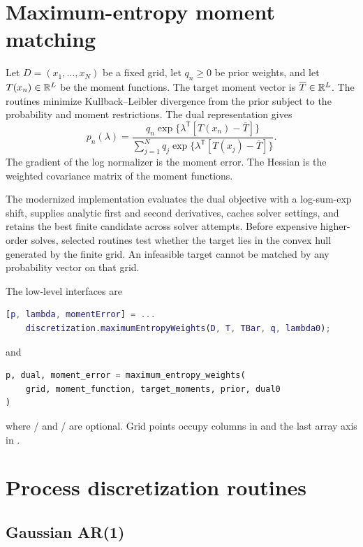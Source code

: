 \section{Maximum-entropy moment matching}
\label{sec:maxent}

Let $D=(x_1,\ldots,x_N)$ be a fixed grid, let $q_n\geq 0$ be prior weights,
and let $T(x_n)\in\mathbb{R}^L$ be the moment functions. The target moment vector is
$\overline T\in\mathbb{R}^L$. The routines minimize Kullback--Leibler divergence from
the prior subject to the probability and moment restrictions. The dual
representation gives
\begin{equation}
  p_n(\lambda)
  = \frac{q_n\exp\{\lambda^{\mathsf T}[T(x_n)-\overline T]\}}
  {\sum_{j=1}^N q_j
  \exp\{\lambda^{\mathsf T}[T(x_j)-\overline T]\}}.
  \label{eq:maxent-probability}
\end{equation}
The gradient of the log normalizer is the moment error. The Hessian is the
weighted covariance matrix of the moment functions.

The modernized implementation evaluates the dual objective with a log-sum-exp
shift, supplies analytic first and second derivatives, caches solver settings,
and retains the best finite candidate across solver attempts. Before expensive
higher-order solves, selected routines test whether the target lies in the
convex hull generated by the finite grid. An infeasible target cannot be
matched by any probability vector on that grid.

The low-level interfaces are
\begin{lstlisting}[language=Matlab]
[p, lambda, momentError] = ...
    discretization.maximumEntropyWeights(D, T, TBar, q, lambda0);
\end{lstlisting}
and
\begin{lstlisting}[language=Python]
p, dual, moment_error = maximum_entropy_weights(
    grid, moment_function, target_moments, prior, dual0
)
\end{lstlisting}
where / and / are optional.
Grid points occupy columns in \matlab{} and the last array axis in \python{}.

\section{Process discretization routines}
\label{sec:processes}

\subsection{Gaussian AR(1)}

